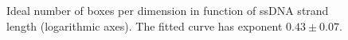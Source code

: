 \begin{figure}[htb]
       \begin{center}
               \scalebox{0.9}{
                        \nonstopmode
                        
                        \errorstopmode
                        \rule[-0.5cm]{0cm}{0cm}}
                \caption{Ideal number of boxes per dimension in function of ssDNA strand length (logarithmic axes). The fitted curve has exponent $0.43 \pm 0.07$.}
                \label{numBoxExponentFit}
        \end{center}
\end{figure}

